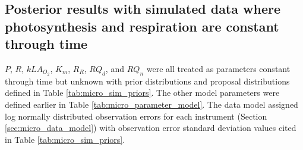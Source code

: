 \documentclass{ruthesis}
\begin{document}

%
%


\FloatBarrier
\subsection{Posterior results with simulated data where photosynthesis and respiration are constant through time}\label{sec:micro_sim_results1}

$P$, $R$, $kLA_{O_2}$, $K_m$, $R_R$, $RQ_d$, and $RQ_n$ were all treated as parameters constant through time but unknown with prior distributions and proposal distributions defined in Table \ref{tab:micro_sim_priors}. The other model parameters were defined earlier in Table \ref{tab:micro_parameter_model}.
The data model assigned log normally distributed observation errors for each instrument (Section \ref{sec:micro_data_model}) with observation error standard deviation values cited in Table \ref{tab:micro_sim_priors}.
\end{document}
